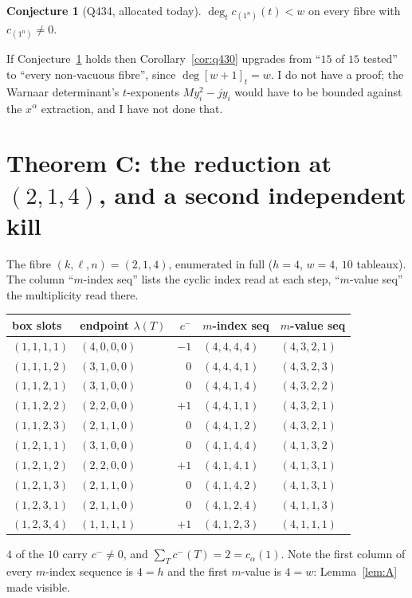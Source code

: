 \documentclass[11pt]{article}
\theoremstyle{plain}
\theoremstyle{definition}
\newtheorem{conjecture}[theorem]{Conjecture}
\theoremstyle{remark}
\newcommand{\cm}{c^{-}}
\newcommand{\qbin}[1]{[#1]_t}
\begin{document}
\begin{conjecture}[Q434, allocated today]\label{conj}
$\deg_t c_{(1^n)}(t)<w$ on every fibre with $c_{(1^n)}\neq0$.
\end{conjecture}
\noindent If Conjecture~\ref{conj} holds then Corollary~\ref{cor:q430} upgrades from
``$15$ of $15$ tested'' to ``every non-vacuous fibre'', since $\deg\qbin{w+1}=w$. I do not
have a proof; the Warnaar determinant's $t$-exponents $My_i^2-jy_i$ would have to be
bounded against the $x^\alpha$ extraction, and I have not done that.

\section{Theorem C: the reduction at $(2,1,4)$, and a second independent kill}

The fibre $(k,\ell,n)=(2,1,4)$, enumerated in full ($h=4$, $w=4$, $10$ tableaux). The
column ``$m$-index seq'' lists the cyclic index read at each step, ``$m$-value seq'' the
multiplicity read there.

\begin{center}\small
\begin{tabular}{@{}l l r l l@{}}
\toprule
box slots & endpoint $\lambda(T)$ & $\cm$ & $m$-index seq & $m$-value seq\\
\midrule
$(1,1,1,1)$&$(4,0,0,0)$&$-1$&$(4,4,4,4)$&$(4,3,2,1)$\\
$(1,1,1,2)$&$(3,1,0,0)$&$0$&$(4,4,4,1)$&$(4,3,2,3)$\\
$(1,1,2,1)$&$(3,1,0,0)$&$0$&$(4,4,1,4)$&$(4,3,2,2)$\\
$(1,1,2,2)$&$(2,2,0,0)$&$+1$&$(4,4,1,1)$&$(4,3,2,1)$\\
$(1,1,2,3)$&$(2,1,1,0)$&$0$&$(4,4,1,2)$&$(4,3,2,1)$\\
$(1,2,1,1)$&$(3,1,0,0)$&$0$&$(4,1,4,4)$&$(4,1,3,2)$\\
$(1,2,1,2)$&$(2,2,0,0)$&$+1$&$(4,1,4,1)$&$(4,1,3,1)$\\
$(1,2,1,3)$&$(2,1,1,0)$&$0$&$(4,1,4,2)$&$(4,1,3,1)$\\
$(1,2,3,1)$&$(2,1,1,0)$&$0$&$(4,1,2,4)$&$(4,1,1,3)$\\
$(1,2,3,4)$&$(1,1,1,1)$&$+1$&$(4,1,2,3)$&$(4,1,1,1)$\\
\bottomrule
\end{tabular}
\end{center}

\noindent $4$ of the $10$ carry $\cm\neq0$, and $\sum_T\cm(T)=2=c_\alpha(1)$.
Note the first column of every $m$-index sequence is $4=h$ and the first $m$-value is
$4=w$: Lemma~\ref{lem:A} made visible.
\end{document}
